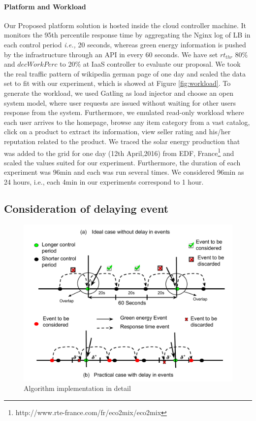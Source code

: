 \paragraph*{\textbf{Platform and Workload}} Our Proposed platform solution is hosted inside the cloud controller
machine. It monitors the 95th percentile response
time by aggregating the Nginx log of LB in each control period \emph{i.e.,} 20 seconds, whereas green energy
information is pushed by the infrastructure through an API in every 60 seconds. We have set $rt_{thr}$ 80\% and $decWorkPerc$ to 20\% at IaaS controller to evaluate our proposal.
We took the real traffic pattern of wikipedia german page of one day \cite{soodeh} and scaled the data set to fit with our experiment,
which is showed at Figure \ref{fig:workload}. 
To generate the workload, we used Gatling as load injector and choose an
open system model, where user requests are issued without
waiting for other users response from the system. 
Furthermore,
we emulated read-only workload where each user arrives to the homepage, browse any item category from a
vast catalog, click on a product to extract its information,
view seller rating and his/her reputation related to the
product. 
We traced the solar energy production that was added to
the grid for one day (12th April,2016) from EDF,
France\footnote{http://www.rte-france.com/fr/eco2mix/eco2mix} and scaled the
values suited for our experiment.
Furthermore, the duration
of each experiment was 96min and each was run several
times. We considered 96min as 24 hours, i.e., each 4min in
our experiments correspond to 1 hour.


\subsection{Consideration of delaying event}

\begin{figure} [htb]
\includegraphics[scale=.35]{Graphs/implementation_UCC.pdf}
\caption{Algorithm implementation in detail}
\label{fig:implementation} 
\end{figure}

